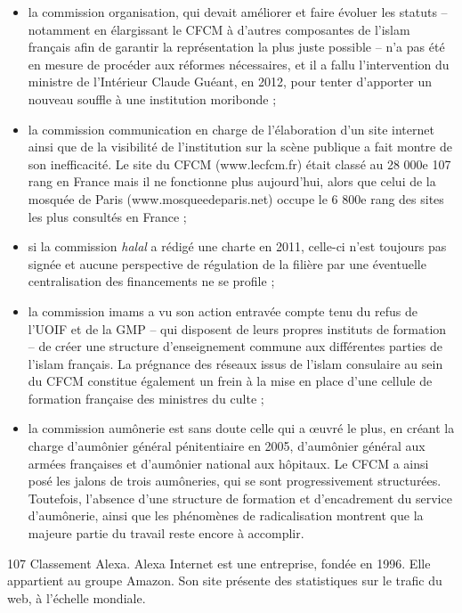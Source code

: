 \begin{itemize}
\item
  la commission organisation, qui devait améliorer et faire évoluer les
  statuts -- notamment en élargissant le CFCM à d'autres composantes de
  l'islam français afin de garantir la représentation la plus juste
  possible -- n'a pas été en mesure de procéder aux réformes
  nécessaires, et il a fallu l'intervention du ministre de l'Intérieur
  Claude Guéant, en 2012, pour tenter d'apporter un nouveau souffle à
  une institution moribonde ;
\item
  la commission communication en charge de l'élaboration d'un site
  internet ainsi que de la visibilité de l'institution sur la scène
  publique a fait montre de son inefficacité. Le site du CFCM
  (www.lecfcm.fr) était classé au 28 000e 107 rang en France mais il ne
  fonctionne plus aujourd'hui, alors que celui de la mosquée de Paris
  (www.mosqueedeparis.net) occupe le 6 800e rang des sites les plus
  consultés en France ;
\item
  si la commission \emph{halal} a rédigé une charte en 2011, celle-ci
  n'est toujours pas signée et aucune perspective de régulation de la
  filière par une éventuelle centralisation des financements ne se
  profile ;
\item
  la commission imams a vu son action entravée compte tenu du refus de
  l'UOIF et de la GMP -- qui disposent de leurs propres instituts de
  formation -- de créer une structure d'enseignement commune aux
  différentes parties de l'islam français. La prégnance des réseaux
  issus de l'islam consulaire au sein du CFCM constitue également un
  frein à la mise en place d'une cellule de formation française des
  ministres du culte ;
\item
  la commission aumônerie est sans doute celle qui a œuvré le plus, en
  créant la charge d'aumônier général pénitentiaire en 2005, d'aumônier
  général aux armées françaises et d'aumônier national aux hôpitaux. Le
  CFCM a ainsi posé les jalons de trois aumôneries, qui se sont
  progressivement structurées. Toutefois, l'absence d'une structure de
  formation et d'encadrement du service d'aumônerie, ainsi que les
  phénomènes de radicalisation montrent que la majeure partie du travail
  reste encore à accomplir.
\end{itemize}


107 Classement Alexa. Alexa Internet est une entreprise, fondée en 1996.
Elle appartient au groupe Amazon. Son site présente des statistiques sur
le trafic du web, à l'échelle mondiale.




